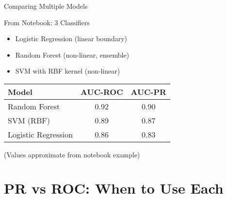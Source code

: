 \documentclass{beamer}
\begin{document}
\begin{frame}{Comparing Multiple Models}
\begin{examplebox}{From Notebook: 3 Classifiers}
\begin{itemize}
    \item Logistic Regression (linear boundary)
    \item Random Forest (non-linear, ensemble)
    \item SVM with RBF kernel (non-linear)
\end{itemize}
\end{examplebox}

\vspace{0.3cm}

\begin{center}
\begin{tabular}{|l|c|c|}
\hline
\textbf{Model} & \textbf{AUC-ROC} & \textbf{AUC-PR} \\
\hline
Random Forest & 0.92 & 0.90 \\
SVM (RBF) & 0.89 & 0.87 \\
Logistic Regression & 0.86 & 0.83 \\
\hline
\end{tabular}
\end{center}

\vspace{0.2cm}

\small
(Values approximate from notebook example)
\end{frame}

\section{PR vs ROC: When to Use Each}
\end{document}
